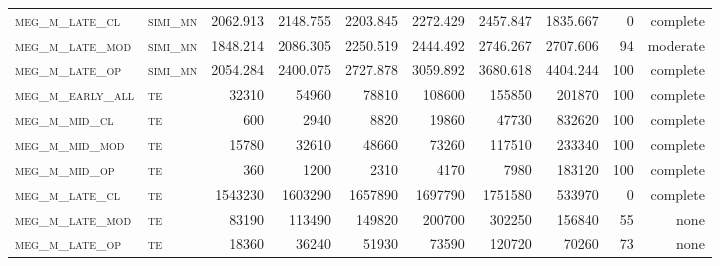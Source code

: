 \begin{landscape}
\begin{center}
\begin{footnotesize}
\begin{longtable}{llrrrrr|rrr}
\textsc{meg\_m\_late\_cl  } & \textsc{simi\_mn  }    & 2062.913 & 2148.755 & 2203.845 & 2272.429 & 2457.847   & 1835.667      & 0             & complete            \\
\textsc{meg\_m\_late\_mod } & \textsc{simi\_mn  }    & 1848.214 & 2086.305 & 2250.519 & 2444.492 & 2746.267   & 2707.606      & 94            & moderate              \\
\textsc{meg\_m\_late\_op  } & \textsc{simi\_mn  }    & 2054.284 & 2400.075 & 2727.878 & 3059.892 & 3680.618   & 4404.244      & 100           & complete             \\%
\textsc{meg\_m\_early\_all} & \textsc{te  		}    & 32310    & 54960    & 78810    & 108600   & 155850     & 201870        & 100           & complete             \\
\textsc{meg\_m\_mid\_cl   } & \textsc{te  		}    & 600      & 2940     & 8820     & 19860    & 47730      & 832620        & 100           & complete             \\
\textsc{meg\_m\_mid\_mod  } & \textsc{te 		}    & 15780    & 32610    & 48660    & 73260    & 117510     & 233340        & 100           & complete             \\
\textsc{meg\_m\_mid\_op   } & \textsc{te 		}    & 360      & 1200     & 2310     & 4170     & 7980       & 183120        & 100           & complete             \\
\textsc{meg\_m\_late\_cl  } & \textsc{te 		}    & 1543230  & 1603290  & 1657890  & 1697790  & 1751580    & 533970        & 0             & complete            \\
\textsc{meg\_m\_late\_mod } & \textsc{te 		}    & 83190    & 113490   & 149820   & 200700   & 302250     & 156840        & 55            & none              \\
\textsc{meg\_m\_late\_op  } & \textsc{te 		}    & 18360    & 36240    & 51930    & 73590    & 120720     & 70260         & 73            & none             %

\end{longtable}
\end{footnotesize}
\end{center}
\end{landscape}

\restoregeometry
\pagestyle{headings}



